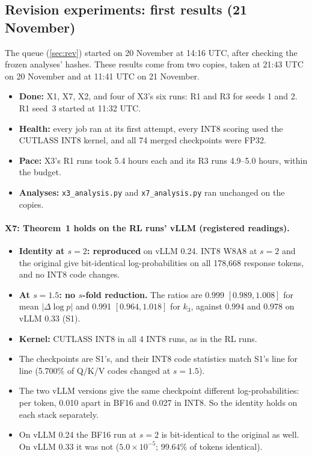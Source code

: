 \documentclass[11pt]{article}
\begin{document}
\subsection{Revision experiments: first results (21 November)}\label{sec:rev-results}
The queue (\cref{sec:rev}) started on 20 November at 14:16 UTC, after checking the frozen analyses' hashes. These results come from two copies, taken at 21:43 UTC on 20 November and at 11:41 UTC on 21 November.
\begin{itemize}
\item \textbf{Done:} X1, X7, X2, and four of X3's six runs: R1 and R3 for seeds 1 and 2. R1 seed~3 started at 11:32 UTC.
\item \textbf{Health:} every job ran at its first attempt, every INT8 scoring used the CUTLASS INT8 kernel, and all 74 merged checkpoints were FP32.
\item \textbf{Pace:} X3's R1 runs took 5.4 hours each and its R3 runs 4.9--5.0 hours, within the budget.
\item \textbf{Analyses:} \texttt{x3\_analysis.py} and \texttt{x7\_analysis.py} ran unchanged on the copies.
\end{itemize}

\paragraph{X7: Theorem~1 holds on the RL runs' vLLM (registered readings).}
\begin{itemize}
\item \textbf{Identity at $s=2$: reproduced} on vLLM 0.24. INT8 W8A8 at $s=2$ and the original give bit-identical log-probabilities on all 178{,}668 response tokens, and no INT8 code changes.
\item \textbf{At $s=1.5$: no $s$-fold reduction.} The ratios are 0.999 $[0.989, 1.008]$ for mean $|\Delta\log p|$ and 0.991 $[0.964, 1.018]$ for $k_3$, against 0.994 and 0.978 on vLLM 0.33 (S1).
\item \textbf{Kernel:} CUTLASS INT8 in all 4 INT8 runs, as in the RL runs.
\item The checkpoints are S1's, and their INT8 code statistics match S1's line for line (5.700\% of Q/K/V codes changed at $s=1.5$).
\item The two vLLM versions give the same checkpoint different log-probabilities: per token, 0.010 apart in BF16 and 0.027 in INT8. So the identity holds on each stack separately.
\item On vLLM 0.24 the BF16 run at $s=2$ is bit-identical to the original as well. On vLLM 0.33 it was not ($5.0\times10^{-5}$; 99.64\% of tokens identical).
\end{itemize}
\end{document}
